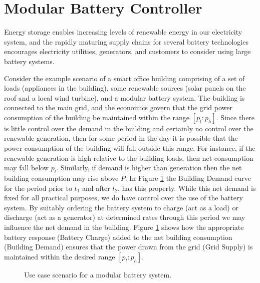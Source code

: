 \section{Modular Battery Controller}\label{sec:introduction}

Energy storage enables increasing levels of renewable energy in our electricity system, and the rapidly maturing supply chains for several battery technologies encourages electricity utilities, generators, and customers to consider using large battery systems. 

Consider the example scenario of a smart office building comprising of a set of loads (appliances in the building), some renewable sources (solar panels on the roof and a local wind turbine), and a modular battery system. The building is connected to the main grid, and the economics govern that the grid power consumption of the building be maintained within the range $[p_l:p_h]$. Since there is little control over the demand in the building and certainly no control over the renewable generation, then for some period in the day it is possible that the power consumption of the building will fall outside this range. For instance, if the renewable generation is high relative to the building loads, then net consumption may fall below $p_l$. Similarly, if demand is higher than generation then the net building consumption may rise above $P$. In Figure \ref{fig:usecase} the Building Demand curve for the period prior to $t_1$ and after $t_2$, has this property. While this net demand is fixed for all practical purposes, we do have control over the use of the battery system. By suitably ordering the battery system to charge (act as a load) or discharge (act as a generator) at determined rates through this period we may influence the net demand in the building. Figure \ref{fig:usecase} shows how the appropriate battery response (Battery Charge) added to the net building consumption (Building Demand) ensures that the power drawn from the grid (Grid Supply) is maintained within the desired range $[p_l:p_h]$.

\begin{figure}[ht]
\begin{center}

\end{center}
\caption{Use case scenario for a modular battery system.}
\label{fig:usecase}
\end{figure}

